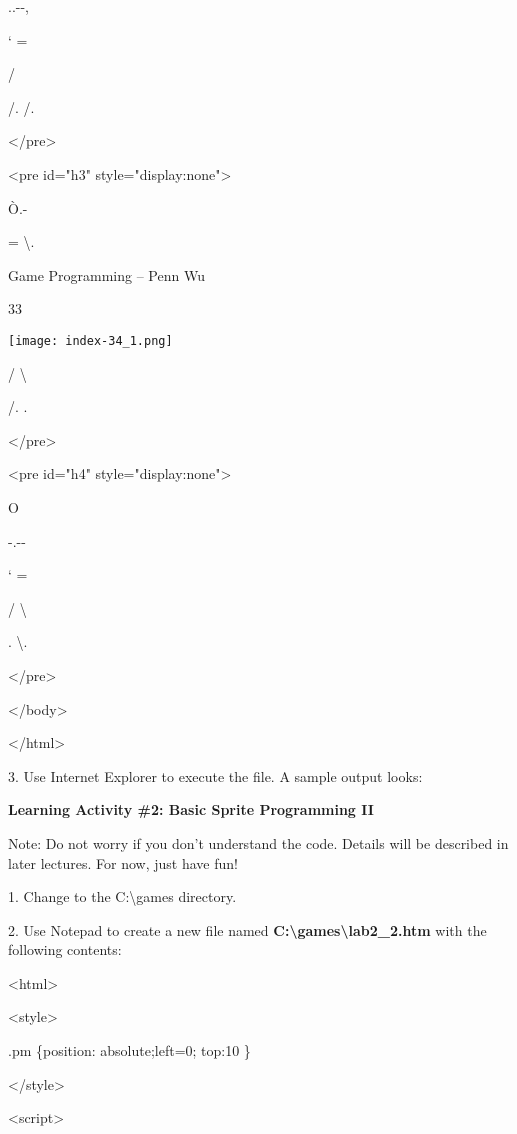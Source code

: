 \documentclass[
]{article}
\begin{document}
..\textbar-\/-,

` =

/ \textbar{}

/. /.

\textless/pre\textgreater{}

\textless pre id="h3" style="display:none"\textgreater{}

Ò.\textbar-

= \textbackslash.

Game Programming -- Penn Wu

33

\protect\hypertarget{index_split_003.htmlux5cux23p34}{}{}\texttt{[image: index-34\_1.png]}

/ \textbackslash{}

/. \textbar.

\textless/pre\textgreater{}

\textless pre id="h4" style="display:none"\textgreater{}

O

-.\textbar-\/-\textquotesingle{}

` =

/ \textbackslash{}

\textbar. \textbackslash.

\textless/pre\textgreater{}

\textless/body\textgreater{}

\textless/html\textgreater{}

3. Use Internet Explorer to execute the file. A sample output looks:

\textbf{}

\textbf{Learning Activity \#2: Basic Sprite Programming II}

\textbf{}

Note: Do not worry if you don't understand the code. Details will be
described in later lectures. For now, just have fun!

\textbf{}

1. Change to the C:\textbackslash games directory.

2. Use Notepad to create a new file named
\textbf{C:\textbackslash games\textbackslash lab2\_2.htm} with the
following contents:

\textless html\textgreater{}

\textless style\textgreater{}

.pm \{position: absolute;left=0; top:10 \}

\textless/style\textgreater{}

\textless script\textgreater{}
\end{document}
